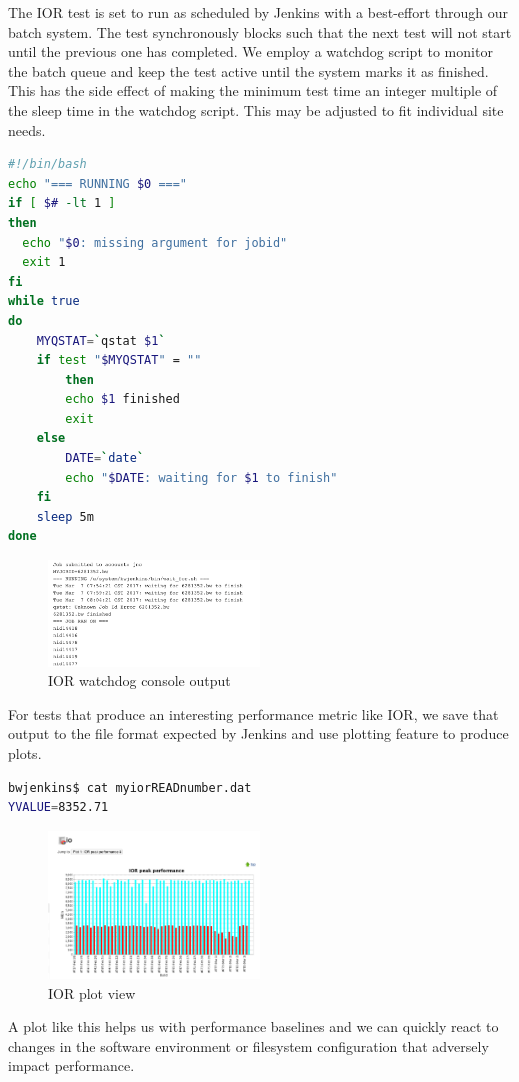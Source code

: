 \documentclass[10pt, conference, compsocconf]{IEEEtran}
\begin{document}
The IOR test is set to run as scheduled by Jenkins with a best-effort through our batch system.  The test synchronously blocks such that the next test will not start until the previous one has completed.  We employ a watchdog script to monitor the batch queue and keep the test active until the system marks it as finished.  This has the side effect of making the minimum test time an integer multiple of the sleep time in the watchdog script.  This may be adjusted to fit individual site needs.
\begin{lstlisting}[frame=tb,captionpos=t,language=bash,caption={pbs/torque watchdog script}, label=lst:watchdog]
#!/bin/bash
echo "=== RUNNING $0 ==="
if [ $# -lt 1 ]
then
  echo "$0: missing argument for jobid"
  exit 1
fi
while true
do
	MYQSTAT=`qstat $1`
	if test "$MYQSTAT" = ""
        then
		echo $1 finished
		exit
	else
		DATE=`date`
		echo "$DATE: waiting for $1 to finish"
	fi
	sleep 5m
done
\end{lstlisting}

\begin{figure}[H]
\centering
\includegraphics[width=0.5\textwidth]{IOR-watchdog-out}
\caption{ IOR watchdog console output }
\label{fig:IOR-watchdog-out}
\end{figure}
For tests that produce an interesting performance metric like IOR, we save that output to the file format expected by Jenkins and use plotting feature to produce plots. 
\begin{lstlisting}[frame=tb,captionpos=t,language=bash,caption={sample YVALUE output file}, label=lst:yvalue]
bwjenkins$ cat myiorREADnumber.dat 
YVALUE=8352.71
\end{lstlisting}
\begin{figure}[H]
\centering
\includegraphics[width=0.5\textwidth]{IOR-plot}
\caption{ IOR plot view }
\label{fig:IOR-plot}
\end{figure}
A plot like this helps us with performance baselines and we can quickly react to changes in the software environment or filesystem configuration that adversely impact performance.
\end{document}
